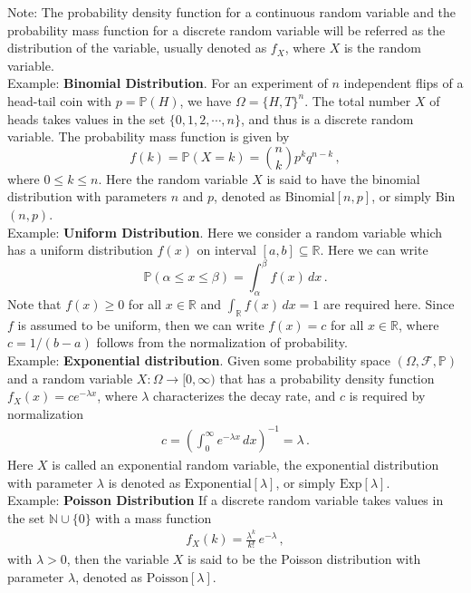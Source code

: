 \documentclass[11pt, onesided]{book}
\theoremstyle{break}
\theoremstyle{break}
\newcommand{\R}{\mathbb{R}}
\newcommand{\N}{\mathbb{N}}
\newcommand{\note}{\color{red}Note: \color{black}}
\newcommand{\example}{\color{green}Example: \color{black}}
\begin{document}
\note The probability density function for a continuous random variable and the probability mass function for a discrete random variable will be referred as the distribution of the variable, usually denoted as $f_X$, where $X$ is the random variable.\\

\example \textbf{Binomial Distribution}. For an experiment of $n$ independent flips of a head-tail coin with $p = \mathbb{P}(H)$, we have $\Omega = \{H,T\}^n$. The total number $X$ of heads takes values in the set $\{0,1,2,\cdots, n\}$, and thus is a discrete random variable. The probability mass function is given by $$f(k)=\mathbb{P}(X = k) = \binom{n}{k}p^k q^{n-k}\,,$$ 
where $0 \leq k \leq n$. Here the random variable $X$ is said to have the binomial distribution with parameters $n$ and $p$, denoted as Binomial$[n,p]$, or simply Bin$(n,p)$.\\

\example \textbf{Uniform Distribution}. Here we consider a random variable which has a uniform distribution $f(x)$ on interval $[a,b]\subseteq \R$. Here we can write
$$\mathbb{P}(\alpha \leq x\leq \beta) = \int_\alpha^\beta f(x) \, dx\,.$$ 
Note that $f(x) \geq 0$ for all $x \in \R$ and $\int_\R f(x)\, dx = 1$ are required here. Since $f$ is assumed to be uniform, then we can write $f(x) = c$ for all $x \in \R$, where $c = 1/(b-a)$ follows from the normalization of probability. \\

\example \textbf{Exponential distribution}. Given some probability space $(\Omega, \mathcal{F}, \mathbb{P})$ and a random variable $X:\Omega\to [0,\infty)$ that has a probability density function $f_X(x) =c e^{-\lambda x}$, where $\lambda$ characterizes the decay rate, and $c$ is required by normalization
\begin{align*}
c = \left( \int_0^\infty e^{-\lambda x} \, dx\right)^{-1} = \lambda\,.
\end{align*}
Here $X$ is called an exponential random variable, the exponential distribution with parameter $\lambda$ is denoted as $\text{Exponential}[\lambda]$, or simply $\text{Exp}[\lambda]$.\\

\example \textbf{Poisson Distribution} If a discrete random variable takes values in the set $\N \cup \{0\}$ with a mass function
\begin{align*}
f_X(k) = \frac{\lambda^k}{k!}\, e^{-\lambda}\,,
\end{align*}
with $\lambda>0$, then the variable $X$ is said to be the Poisson distribution with parameter $\lambda$, denoted as $\text{Poisson}[\lambda]$.
\end{document}

